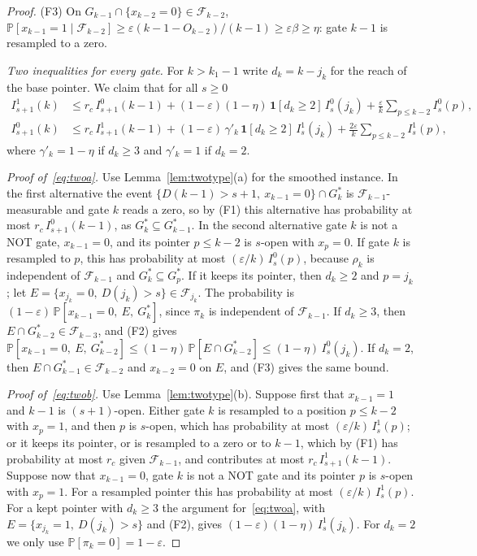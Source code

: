 \documentclass[11pt]{amsart}
\theoremstyle{definition}
\theoremstyle{remark}
\newcommand{\eps}{\varepsilon}
\newcommand{\PP}{\mathbb{P}}
\newcommand{\cF}{\mathcal{F}}
\begin{document}
\begin{proof}
(F3) On $G_{k-1}\cap\{x_{k-2}=0\}\in\cF_{k-2}$,
$\PP[x_{k-1}=1\mid\cF_{k-2}]\ge\eps(k-1-O_{k-2})/(k-1)\ge\eps\beta\ge\eta$: gate $k-1$ is resampled
to a zero.

\emph{Two inequalities for every gate.} For $k>k_1-1$ write $d_k=k-j_k$ for the reach of the base
pointer. We claim that for all $s\ge0$
\begin{align}
I^1_{s+1}(k)&\le r_c\,I^0_{s+1}(k-1)+(1-\eps)(1-\eta)\,\mathbf 1[d_k\ge2]\,I^0_s(j_k)
+\frac\eps k\sum_{p\le k-2}I^0_s(p),\label{eq:twoa}\\
I^0_{s+1}(k)&\le r_c\,I^1_{s+1}(k-1)+(1-\eps)\,\gamma'_k\,\mathbf 1[d_k\ge2]\,I^1_s(j_k)
+\frac{2\eps}k\sum_{p\le k-2}I^1_s(p),\label{eq:twob}
\end{align}
where $\gamma'_k=1-\eta$ if $d_k\ge3$ and $\gamma'_k=1$ if $d_k=2$.

\emph{Proof of~\eqref{eq:twoa}.} Use Lemma~\ref{lem:twotype}(a) for the smoothed instance. In the
first alternative the event $\{D(k-1)>s+1,\ x_{k-1}=0\}\cap G^*_k$ is $\cF_{k-1}$-measurable and
gate $k$ reads a zero, so by (F1) this alternative has probability at most
$r_c\,I^0_{s+1}(k-1)$, as $G^*_k\subseteq G^*_{k-1}$. In the second alternative gate $k$ is not a
NOT gate, $x_{k-1}=0$, and its pointer $p\le k-2$ is $s$-open with $x_p=0$. If gate $k$ is
resampled to $p$, this has probability at most $(\eps/k)\,I^0_s(p)$, because $\rho_k$ is independent
of $\cF_{k-1}$ and $G^*_k\subseteq G^*_p$. If it keeps its pointer, then $d_k\ge2$ and $p=j_k$; let
$E=\{x_{j_k}=0,\ D(j_k)>s\}\in\cF_{j_k}$. The probability is $(1-\eps)\,\PP[x_{k-1}=0,\ E,\ G^*_k]$,
since $\pi_k$ is independent of $\cF_{k-1}$. If $d_k\ge3$, then $E\cap G^*_{k-2}\in\cF_{k-3}$, and
(F2) gives $\PP[x_{k-1}=0,\ E,\ G^*_{k-2}]\le(1-\eta)\,\PP[E\cap G^*_{k-2}]\le(1-\eta)\,I^0_s(j_k)$. If
$d_k=2$, then $E\cap G^*_{k-1}\in\cF_{k-2}$ and $x_{k-2}=0$ on $E$, and (F3) gives the same bound.

\emph{Proof of~\eqref{eq:twob}.} Use Lemma~\ref{lem:twotype}(b). Suppose first that $x_{k-1}=1$
and $k-1$ is $(s+1)$-open. Either gate $k$ is resampled to a position $p\le k-2$ with $x_p=1$,
and then $p$ is $s$-open, which has probability at most $(\eps/k)\,I^1_s(p)$; or it keeps its
pointer, or is resampled to a zero or to $k-1$, which by (F1) has probability at most $r_c$ given
$\cF_{k-1}$, and contributes at most $r_c\,I^1_{s+1}(k-1)$. Suppose now that $x_{k-1}=0$, gate $k$
is not a NOT gate and its pointer $p$ is $s$-open with $x_p=1$. For a resampled pointer this has
probability at most $(\eps/k)\,I^1_s(p)$. For a kept pointer with $d_k\ge3$ the argument
for~\eqref{eq:twoa}, with $E=\{x_{j_k}=1,\ D(j_k)>s\}$ and (F2), gives
$(1-\eps)(1-\eta)\,I^1_s(j_k)$. For $d_k=2$ we only use $\PP[\pi_k=0]=1-\eps$.


\end{proof}
\end{document}
